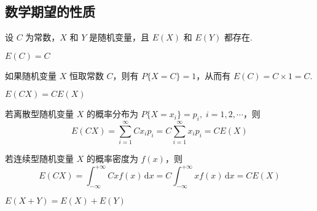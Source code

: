 \subsection{数学期望的性质}

设 $C$ 为常数，$X$ 和 $Y$ 是随机变量，且 $E(X)$ 和 $E(Y)$ 都存在.

\setcounter{propertyname}{0}

\begin{property} \label{property:E(C)=C}
    $E(C)=C$
\end{property}

\begin{myproof}
    如果随机变量 $X$ 恒取常数 $C$，则有 $P\{X=C\}=1$，从而有 $E(C) = C \times 1 = C$.
\end{myproof}

\begin{property} \label{property:E(CX)=CE(X)}
    $E(CX)=CE(X)$
\end{property}

\begin{myproof}
    若离散型随机变量 $X$ 的概率分布为 $P\{X=x_i\}=p_i, \; i=1,2,\cdots$，则
    $$
    E(CX) = \sum_{i=1}^{\infty} C x_i p_i = C \sum_{i=1}^{\infty} x_i p_i = CE(X)
    $$

    若连续型随机变量 $X$ 的概率密度为 $f(x)$，则
    $$
    E(CX) = \int_{-\infty}^{+\infty} Cx f(x) \, \text{d}x = C \int_{-\infty}^{+\infty} x f(x) \, \text{d}x = CE(X)
    $$
\end{myproof}

\begin{property} \label{property:E(X+Y)=E(X)+E(Y)}
    $E(X+Y)=E(X)+E(Y)$
\end{property}

